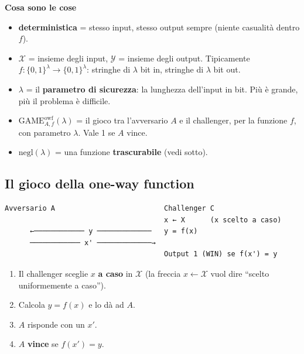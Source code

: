 \begin{nota}

\textbf{Cosa sono le cose}

\begin{itemize}
\tightlist
\item
  \textbf{deterministica} = stesso input, stesso output sempre (niente casualità dentro \(f\)).
\item
  \(\mathcal{X}\) = insieme degli input, \(\mathcal{Y}\) = insieme degli output. Tipicamente \(f : \{0,1\}^\lambda \to \{0,1\}^\lambda\): stringhe di \(\lambda\) bit in, stringhe di \(\lambda\) bit out.
\item
  \(\lambda\) = il \textbf{parametro di sicurezza}: la lunghezza dell'input in bit. Più è grande, più il problema è difficile.
\item
  \(\text{GAME}^{\text{owf}}_{A,f}(\lambda)\) = il gioco tra l'avversario \(A\) e il challenger, per la funzione \(f\), con parametro \(\lambda\). Vale 1 se \(A\) vince.
\item
  \(\text{negl}(\lambda)\) = una funzione \textbf{trascurabile} (vedi sotto).
\end{itemize}

\end{nota}

\subsection{Il gioco della one-way function}

\begin{verbatim}
Avversario A                          Challenger C
                                      x ← X      (x scelto a caso)
      ←──────────── y ─────────────   y = f(x)
      ──────────── x' ─────────────→
                                      Output 1 (WIN) se f(x') = y
\end{verbatim}

\begin{enumerate}
\def\labelenumi{\arabic{enumi}.}
\tightlist
\item
  Il challenger sceglie \(x\) \textbf{a caso} in \(\mathcal{X}\) (la freccia \(x \leftarrow \mathcal{X}\) vuol dire ``scelto uniformemente a caso'').
\item
  Calcola \(y = f(x)\) e lo dà ad \(A\).
\item
  \(A\) risponde con un \(x'\).
\item
  \(A\) \textbf{vince} se \(f(x') = y\).
\end{enumerate}

